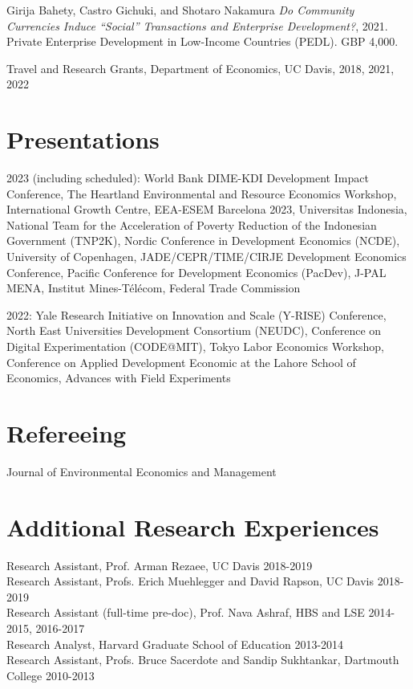 \documentclass[10pt]{res} %
\begin{document}
\begin{resume}
		\hangindent=0.7cm Girija Bahety, Castro Gichuki, and Shotaro Nakamura \textit{Do Community Currencies Induce ``Social'' Transactions and Enterprise Development?}, 2021. Private Enterprise Development in Low-Income Countries (PEDL). GBP 4,000. 
		
		\hangindent=0.7cm  Travel and Research Grants, Department of Economics, UC Davis,  \hfill 2018, 2021, 2022
		
		
		\section{Presentations}
		\hangindent=0.7cm 2023 (including scheduled): World Bank DIME-KDI Development Impact Conference, The Heartland Environmental and Resource Economics Workshop, International Growth Centre, EEA-ESEM Barcelona 2023, Universitas Indonesia, National Team for the Acceleration of Poverty Reduction of the Indonesian Government (TNP2K), Nordic Conference in Development Economics (NCDE), University of Copenhagen, JADE/CEPR/TIME/CIRJE Development Economics Conference, Pacific Conference for Development Economics (PacDev), J-PAL MENA, Institut Mines-T\'{e}l\'{e}com, Federal Trade Commission
		
		\hangindent=0.7cm 2022: Yale Research Initiative on Innovation and Scale (Y-RISE) Conference, North East Universities Development Consortium (NEUDC), Conference on Digital Experimentation (CODE@MIT), Tokyo Labor Economics Workshop, Conference on Applied Development Economic at the Lahore School of Economics, Advances with Field Experiments
		
		\section{Refereeing}
		Journal of Environmental Economics and Management
		
		\section{Additional Research Experiences}
		Research Assistant, Prof. Arman Rezaee, UC Davis \hfill 2018-2019 \\
		Research Assistant, Profs. Erich Muehlegger and David Rapson, UC Davis \hfill 2018-2019 \\
		Research Assistant (full-time pre-doc), Prof. Nava Ashraf, HBS and LSE \hfill 2014-2015, 2016-2017 \\
		Research Analyst, Harvard Graduate School of Education  \hfill  2013-2014 \\
		Research Assistant, Profs. Bruce Sacerdote and Sandip Sukhtankar, Dartmouth College \hfill 2010-2013
		

\end{resume}
\end{document}
